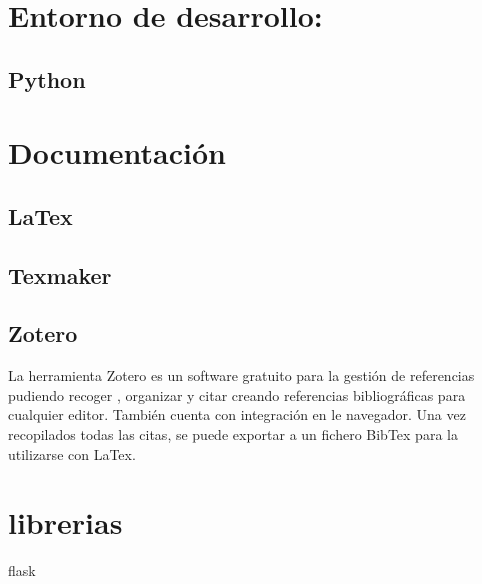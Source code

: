 \section{Entorno de desarrollo:}\label{IDE}
	\subsection{Python}\label{Python}

\section{Documentación}\label{Documentación}
	\subsection{LaTex}\label{LaTex}
		\subsection{Texmaker}\label{Texmaker}
	\subsection{Zotero}\label{zotero}
La herramienta Zotero es un software gratuito para la gestión de referencias pudiendo recoger , organizar y citar creando referencias bibliográficas para cualquier editor. También cuenta con integración en le navegador. Una vez recopilados todas las citas, se puede exportar a un fichero BibTex para la utilizarse con LaTex.\cite{}

\section{librerias}\label{librerias}
flask

